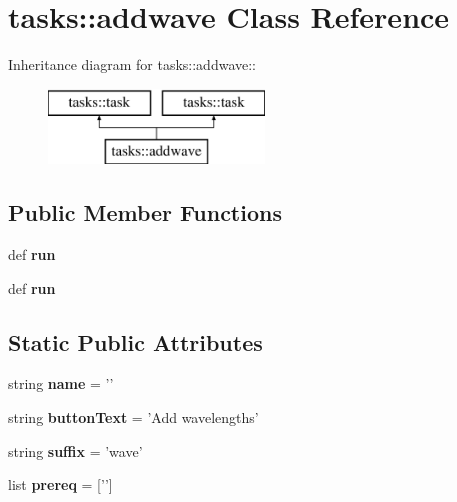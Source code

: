 \section{tasks::addwave Class Reference}
\label{classtasks_1_1addwave}
Inheritance diagram for tasks::addwave::\begin{figure}[H]
\begin{center}
\leavevmode
\includegraphics[height=2cm]{classtasks_1_1addwave}
\end{center}
\end{figure}
\subsection*{Public Member Functions}
\begin{CompactItemize}
\item 
def \textbf{run}\label{classtasks_1_1addwave_4a8ed1b51830f9a6271981d584b71a5e}

\item 
def \textbf{run}\label{classtasks_1_1addwave_4a8ed1b51830f9a6271981d584b71a5e}

\end{CompactItemize}
\subsection*{Static Public Attributes}
\begin{CompactItemize}
\item 
string \textbf{name} = '{\bfaddwave}'\label{classtasks_1_1addwave_50238349fcf518ca91b72579b452d0f0}

\item 
string \textbf{button\-Text} = 'Add wavelengths'\label{classtasks_1_1addwave_f035e4aefe65f969b93658538d1fd0d3}

\item 
string \textbf{suffix} = 'wave'\label{classtasks_1_1addwave_6a9791b9244d63099175839c7043fc97}

\item 
list \textbf{prereq} = ['{\bfextspec}']\label{classtasks_1_1addwave_fb86f5c9b6bff73826404872a2ecd16a}

\end{CompactItemize}


